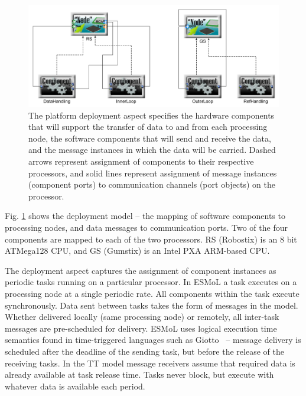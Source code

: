 \begin{figure}
\centering
\includegraphics[width=0.75\columnwidth]{figures/quadrotor_hw_mapping.png}
    \caption{The platform deployment aspect specifies the hardware
components that will support the transfer of data to and from each processing
node, the software components that will send and receive the data, and the
message instances in which the data will be carried.  Dashed arrows represent
assignment of components to their respective processors, and solid lines
represent assignment of message instances (component ports) to communication
channels (port objects) on the processor.}
    \label{fig:qr_hw_mapping}
\end{figure}

Fig. \ref{fig:qr_hw_mapping} shows the deployment model -- the mapping
of software components to processing nodes, and data messages to communication
ports.  Two of the four components are mapped to each of the two processors.  RS
(Robostix) is an 8 bit ATMega128 CPU, and GS (Gumstix) is an Intel PXA ARM-based CPU.



The deployment aspect captures the assignment of component instances as periodic tasks running 
on a particular processor.  In ESMoL a task executes on a processing node at a single periodic rate.  All 
components within the task execute synchronously.  Data sent between tasks takes the form of messages in 
the model.  Whether delivered locally (same processing node) or remotely, all inter-task messages are 
pre-scheduled for delivery.  ESMoL uses logical execution time semantics found in time-triggered 
languages such as Giotto~\cite{timed:giotto} -- message delivery is scheduled after the deadline of 
the sending task, but before the release of the receiving tasks.  In the TT model message receivers 
assume that required data is already available at task release time.  Tasks never block, but execute with 
whatever data is available each period.

